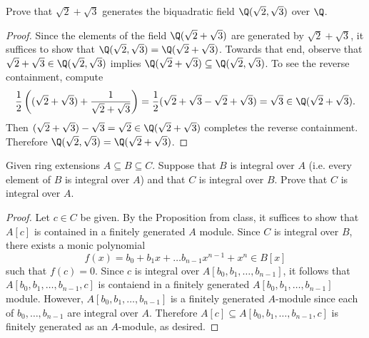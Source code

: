 \documentclass[10pt]{amsart}
\begin{document}
\begin{thm}
  Prove that $\sqrt{2} + \sqrt{3}$ generates the biquadratic field $\Q(\sqrt{2}, \sqrt{3})$ over $\Q$.
  \begin{proof}
    Since the elements of the field $\Q(\sqrt{2} + \sqrt{3})$ are generated by $\sqrt{2} + \sqrt{3}$, it suffices to show that $\Q(\sqrt{2}, \sqrt{3}) = \Q(\sqrt{2} + \sqrt{3})$.
    Towards that end, observe that $\sqrt{2} + \sqrt{3} \in \Q(\sqrt{2}, \sqrt{3})$ implies $\Q(\sqrt{2} + \sqrt{3}) \subseteq \Q(\sqrt{2}, \sqrt{3})$.
    To see the reverse containment, compute
    $$\frac{1}{2} \left( (\sqrt{2} + \sqrt{3}) + \frac{1}{\sqrt{2} + \sqrt{3}} \right) = \frac{1}{2}(\sqrt{2} + \sqrt{3} - \sqrt{2} + \sqrt{3}) = \sqrt{3} \in \Q(\sqrt{2} + \sqrt{3}).$$
    Then $(\sqrt{2} + \sqrt{3}) - \sqrt{3} = \sqrt{2} \in \Q(\sqrt{2} + \sqrt{3})$ completes the reverse containment.
    Therefore $\Q(\sqrt{2}, \sqrt{3}) = \Q(\sqrt{2} + \sqrt{3})$.
  \end{proof}
\end{thm}

    
\begin{thm}
  Given ring extensions $A \subseteq B \subseteq C$.
  Suppose that $B$ is integral over $A$ (i.e. every element of $B$ is integral over $A$) and that $C$ is integral over $B$.
  Prove that $C$ is integral over $A$.

\begin{proof}
  Let $c \in C$ be given.
  By the Proposition from class, it suffices to show that $A[c]$ is contained in a finitely generated $A$ module.
  Since $C$ is integral over $B$, there exists a monic polynomial $$f(x) = b_0 + b_1x + \ldots b_{n-1}x^{n-1} + x^n \in B[x]$$ such that $f(c) = 0$.
  Since $c$ is integral over $A[b_0, b_1, \ldots, b_{n-1}]$, it follows that $A[b_0, b_1, \ldots, b_{n-1}, c]$ is contaiend in a finitely generated $A[b_0, b_1, \ldots, b_{n-1}]$ module.
  However, $A[b_0, b_1, \ldots, b_{n-1}]$ is a finitely generated $A$-module since each of $b_0, \ldots, b_{n-1}$ are integral over $A$.
  Therefore $A[c] \subseteq A[b_0, b_1, \ldots, b_{n-1}, c]$ is finitely generated as an $A$-module, as desired.
\end{proof}
\end{thm}
\end{document}
